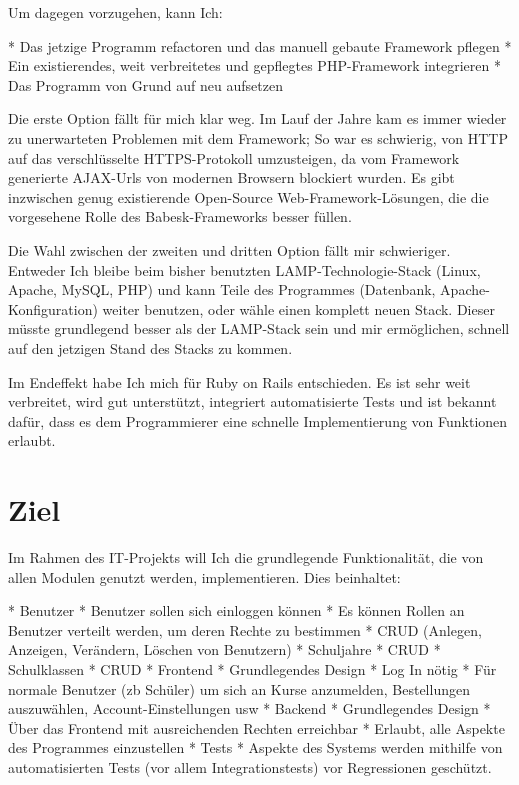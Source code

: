 \documentclass[a4paper,10pt]{scrartcl}
\begin{document}
    Um dagegen vorzugehen, kann Ich:

      * Das jetzige Programm refactoren und das manuell gebaute Framework
        pflegen
      * Ein existierendes, weit verbreitetes und gepflegtes PHP-Framework
        integrieren
      * Das Programm von Grund auf neu aufsetzen

    Die erste Option fällt für mich klar weg.
    Im Lauf der Jahre kam es immer wieder zu unerwarteten Problemen mit dem
    Framework; So war es schwierig, von HTTP auf das verschlüsselte
    HTTPS-Protokoll umzusteigen, da vom Framework generierte AJAX-Urls von
    modernen Browsern blockiert wurden.
    Es gibt inzwischen genug existierende Open-Source Web-Framework-Lösungen,
    die die vorgesehene Rolle des Babesk-Frameworks besser füllen.

    Die Wahl zwischen der zweiten und dritten Option fällt mir schwieriger.
    Entweder Ich bleibe beim bisher benutzten LAMP-Technologie-Stack
    (Linux, Apache, MySQL, PHP) und kann Teile des Programmes
    (Datenbank, Apache-Konfiguration) weiter benutzen, oder wähle einen komplett
    neuen Stack.
    Dieser müsste grundlegend besser als der LAMP-Stack sein und mir
    ermöglichen, schnell auf den jetzigen Stand des Stacks zu kommen.

    Im Endeffekt habe Ich mich für Ruby on Rails entschieden.
    Es ist sehr weit verbreitet, wird gut unterstützt, integriert automatisierte
    Tests und ist bekannt dafür, dass es dem Programmierer eine schnelle
    Implementierung von Funktionen erlaubt.

\section{Ziel}

  Im Rahmen des IT-Projekts will Ich die grundlegende Funktionalität, die von
  allen Modulen genutzt werden, implementieren.
  Dies beinhaltet:

  * Benutzer
    * Benutzer sollen sich einloggen können
    * Es können Rollen an Benutzer verteilt werden, um deren Rechte zu
      bestimmen
    * CRUD (Anlegen, Anzeigen, Verändern, Löschen von Benutzern)
  * Schuljahre
    * CRUD
  * Schulklassen
    * CRUD
  * Frontend
    * Grundlegendes Design
    * Log In nötig
    * Für normale Benutzer (zb Schüler) um sich an Kurse anzumelden,
      Bestellungen auszuwählen, Account-Einstellungen usw
  * Backend
    * Grundlegendes Design
    * Über das Frontend mit ausreichenden Rechten erreichbar
    * Erlaubt, alle Aspekte des Programmes einzustellen
  * Tests
    * Aspekte des Systems werden mithilfe von automatisierten Tests (vor allem
      Integrationstests) vor Regressionen geschützt.
\end{document}
